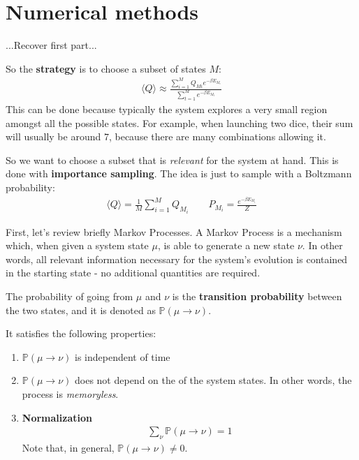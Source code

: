\documentclass[../template.tex]{subfiles}
\begin{document}
\section{Numerical methods}

...Recover first part...

So the \textbf{strategy} is to choose a subset of states $M$:
\begin{align*}
    \langle Q \rangle \approx \frac{\displaystyle \sum_{i=1}^M Q_{Mi} e^{- \beta E_{M_i}}}{\sum_{t=1}^M e^{-\beta E_{M_t}}} 
\end{align*} 
This can be done because typically the system explores a very small region amongst all the possible states.
For example, when launching two dice, their sum will usually be around $7$, because there are many combinations allowing it.

\medskip

So we want to choose a subset that is \textit{relevant} for the system at hand. This is done with \textbf{importance sampling}. The idea is just to sample with a Boltzmann probability:
\begin{align*}
    \langle Q \rangle = \frac{1}{M} \sum_{i=1}^M Q_{M_i} \qquad P_{M_i} = \frac{e^{-\beta E_{M_i}}}{Z}  
\end{align*}   

First, let's review briefly Markov Processes. A Markov Process is a mechanism which, when given a system state $\mu$, is able to generate a new state $\nu$. In other words, all relevant information necessary for the system's evolution is contained in the starting state - no additional quantities are required. 

The probability of going from $\mu$ and $\nu$ is the \textbf{transition probability} between the two states, and it is denoted as $\mathbb{P}(\mu \to \nu)$.

It satisfies the following properties:
\begin{enumerate}
    \item $\mathbb{P}(\mu \to \nu)$ is independent of time
    \item $\mathbb{P}(\mu \to \nu)$ does not depend on the  of the system states. In other words, the process is \textit{memoryless}.
    \item \textbf{Normalization} 
    \begin{align*}
        \sum_{\nu} \mathbb{P}(\mu \to \nu) = 1        
    \end{align*}
    Note that, in general, $\mathbb{P}(\mu \to \nu) \neq 0$.
\end{enumerate}
\end{document}
